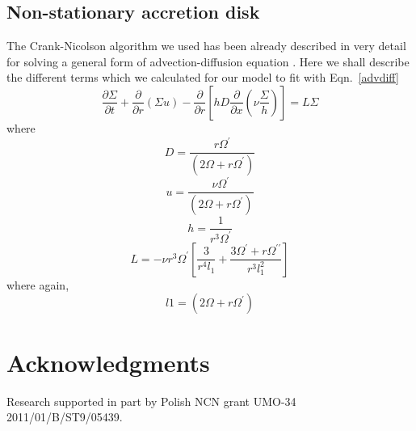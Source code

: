 \documentclass[useAMS,usenatbib]{mn2e}
\begin{document}
\subsection{Non-stationary accretion disk}
The Crank-Nicolson algorithm we used has been already described in very detail for solving a general form of advection-diffusion equation \citep{2010A&A...513A..79B}. Here we shall describe the different terms which we calculated for our model to fit with Eqn.~\ref{advdiff}  
\begin{equation}
\frac{\partial\Sigma}{\partial t} + \frac{\partial}{\partial r}(\Sigma u) - \frac{\partial}{\partial r}\left[h D\frac{\partial}{\partial x}\left(\nu\frac{\Sigma}{h}\right)\right] = L\Sigma
\label{advdiff}
\end{equation}
where
\begin{equation}
D = \frac{r\Omega^\prime}{\left(2\Omega + r\Omega^\prime\right)}
\label{D}
\end{equation}
\begin{equation}
u = \frac{\nu\Omega^\prime}{\left(2\Omega + r\Omega^\prime\right)}
\end{equation}
\begin{equation}
h = \frac{1}{r^3\Omega^\prime}
\end{equation}
\begin{equation}
L = -\nu r^3\Omega^\prime\left[\frac{3}{r^4 l_1} +\frac{3\Omega^\prime + r\Omega^{\prime\prime}}{r^3l_1^2}\right]
\end{equation}
where again,
\begin{equation}
l1 = (2\Omega + r\Omega^\prime)
\end{equation}
\label{lastpage}
\section*{Acknowledgments}
Research supported in part by Polish NCN grant UMO-34 2011/01/B/ST9/05439.


\end{document}
